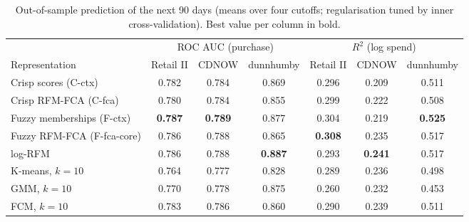 \begin{table}[t]
\centering\small
\caption{Out-of-sample prediction of the next 90 days (means over four cutoffs; regularisation tuned by inner cross-validation). Best value per column in bold.}
\label{tab:prediction}
\begin{tabular}{lcccccc}
\toprule
 & \multicolumn{3}{c}{ROC AUC (purchase)} & \multicolumn{3}{c}{$R^2$ (log spend)} \\
\cmidrule(lr){2-4}\cmidrule(lr){5-7}
Representation & Retail II & CDNOW & dunnhumby & Retail II & CDNOW & dunnhumby \\
\midrule
Crisp scores (C-ctx) & 0.782 & 0.784 & 0.869 & 0.296 & 0.209 & 0.511 \\
Crisp RFM-FCA (C-fca) & 0.780 & 0.784 & 0.855 & 0.299 & 0.222 & 0.508 \\
Fuzzy memberships (F-ctx) & \textbf{0.787} & \textbf{0.789} & 0.877 & 0.304 & 0.219 & \textbf{0.525} \\
Fuzzy RFM-FCA (F-fca-core) & 0.786 & 0.788 & 0.865 & \textbf{0.308} & 0.235 & 0.517 \\
log-RFM & 0.786 & 0.788 & \textbf{0.887} & 0.293 & \textbf{0.241} & 0.517 \\
K-means, $k{=}10$ & 0.764 & 0.777 & 0.828 & 0.289 & 0.236 & 0.498 \\
GMM, $k{=}10$ & 0.770 & 0.778 & 0.875 & 0.260 & 0.232 & 0.453 \\
FCM, $k{=}10$ & 0.783 & 0.786 & 0.860 & 0.290 & 0.239 & 0.511 \\
\bottomrule
\end{tabular}
\end{table}
